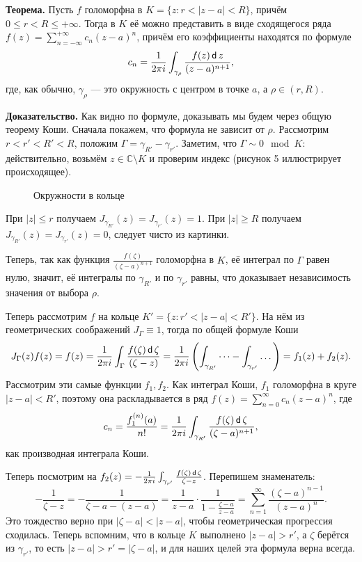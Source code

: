 \textbf{Теорема.} Пусть $f$ голоморфна в $K = \{z: r < |z - a| < R\}$, причём $0 \le r < R \le +\infty$.
Тогда в $K$ её можно представить в виде сходящегося ряда $f(z) = \sum_{n=-\infty}^{+\infty} c_n (z - a)^n$, причём его коэффициенты находятся по формуле
\[
    c_n = \frac{1}{2\pi i} \int_{\gamma_\rho} \frac{f(z) \operatorname{\mathsf d} z}{(z - a)^{n+1}},
\]
где, как обычно, $\gamma_\rho$ --- это окружность с центром в точке $a$, а $\rho \in (r, R)$.

\textbf{Доказательство.} Как видно по формуле, доказывать мы будем через общую теорему Коши.
Сначала покажем, что формула не зависит от $\rho$.
Рассмотрим $r < r' < R' < R$, положим $\Gamma = \gamma_{R'} - \gamma_{r'}$.
Заметим, что $\Gamma \sim 0 \mod K$: действительно, возьмём $z \in \mathbb C \setminus K$ и проверим индекс (рисунок 5 иллюстрирует происходящее).
\begin{figure}[ht]
    \centering
    \caption{Окружности в кольце}
\end{figure}

При $|z| \le r$ получаем $J_{\gamma_{R'}}(z) = J_{\gamma_{r'}}(z) = 1$.
При $|z| \ge R$ получаем $J_{\gamma_{R'}}(z) = J_{\gamma_{r'}}(z) = 0$, следует чисто из картинки.

Теперь, так как функция $\frac{f(\zeta)}{(\zeta - a)^{n+1}}$ голоморфна в $K$, её интеграл по $\Gamma$ равен нулю, значит, её интегралы по $\gamma_{R'}$ и по $\gamma_{r'}$ равны, что доказывает независимость значения от выбора $\rho$.

Теперь рассмотрим $f$ на кольце $K' = \{z: r' < |z - a| < R'\}$.
На нём из геометрических соображений $J_\Gamma \equiv 1$, тогда по общей формуле Коши
\[
    J_\Gamma(z) f(z) = f(z) = \frac{1}{2\pi i} \int_\Gamma \frac{f(\zeta) \operatorname{\mathsf d} \zeta}{(\zeta - z)} = \frac{1}{2\pi i} \left( \int_{\gamma_{R'}} \dots - \int_{\gamma_{r'}} \dots \right) = f_1(z) + f_2(z).
\]
Рассмотрим эти самые функции $f_1, f_2$.
Как интеграл Коши, $f_1$ голоморфна в круге $|z - a| < R'$, поэтому она раскладывается в ряд $f(z) = \sum_{n=0}^{\infty} c_n (z - a)^n$, где
\[
    c_n = \frac{f_1^{(n)}(a)}{n!} = \frac{1}{2\pi i} \int_{\gamma_{R'}} \frac{f(\zeta) \operatorname{\mathsf d} \zeta}{(\zeta - a)^{n+1}},
\]
как производная интеграла Коши.

Теперь посмотрим на $f_2(z) = - \frac{1}{2\pi i} \int_{\gamma_{r'}} \frac{f(\zeta) \operatorname{\mathsf d} \zeta}{\zeta - z}$.
Перепишем знаменатель:
\[
    -\frac{1}{\zeta - z} = -\frac{1}{\zeta - a - (z - a)} = \frac{1}{z - a} \cdot \frac{1}{1 - \frac{\zeta - a}{z - a}} = \sum_{n=1}^{\infty} \frac{(\zeta - a)^{n-1}}{(z - a)^n}.
\]
Это тождество верно при $|\zeta - a| < |z - a|$, чтобы геометрическая прогрессия сходилась.
Теперь вспомним, что в кольце $K$ выполнено $|z - a| > r'$, а $\zeta$ берётся из $\gamma_{r'}$, то есть $|z - a| > r' = |\zeta - a|$, и для наших целей эта формула верна всегда.

